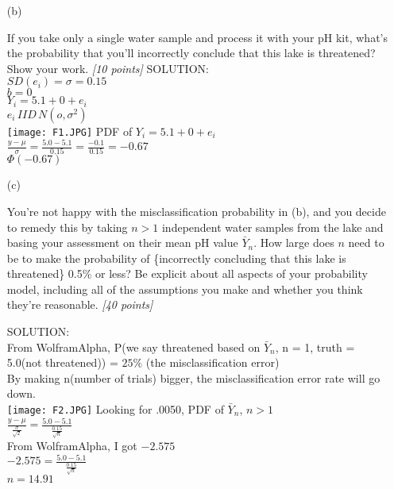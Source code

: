 \documentclass[12pt]{article}
\begin{document}
\begin{itemize}

\item[(b)]

If you take only a single water sample and process it with your pH kit,
what's the probability that you'll incorrectly conclude that this lake is
threatened? Show your work. \textit{[10 points]}
\medskip
SOLUTION: \\
$SD(e_i) = \sigma = 0.15$\\
$b = 0$\\
$Y_i = 5.1 + 0 + e_i$\\
$e_i \, IID \, N(o, \sigma^2)$\\
\texttt{[image: F1.JPG]} PDF of $Y_i = 5.1 + 0 + e_i$ \\
\huge $\frac{y - \mu}{\sigma} = \frac{5.0-5.1}{0.15} = \frac{-0.1}{0.15} = -0.67$ \\
$\Phi(-0.67)$

\item[(c)]

\normalsize You're not happy with the misclassification probability in (b), and you
decide to remedy this by taking $n > 1$ independent water samples from the
lake and basing your assessment on their mean pH value $\bar{ Y }_n$. How
large does $n$ need to be to make the probability of \{incorrectly
concluding that this lake is threatened\} 0.5\% or less? Be explicit
about all aspects of your probability model, including all of the assumptions you make and whether you think they're reasonable. \textit{[40 points]} 

SOLUTION:\\
From WolframAlpha, P(we say threatened based on $\bar Y_n$, n = 1, truth = 5.0(not threatened)) = $25\%$ (the misclassification error) \\
By making n(number of trials) bigger, the misclassification error rate will go down. \\
\texttt{[image: F2.JPG]} Looking for .0050, PDF of $\bar Y_n$, $n>1$ \\
\huge $\frac{y - \mu}{\frac{\sigma}{\sqrt{2}}} = \frac{5.0-5.1}{\frac{0.15}{\sqrt{n}}}$\\
\normalsize From WolframAlpha, I got $-2.575$ \\
\huge $-2.575 = \frac{5.0-5.1}{\frac{0.15}{\sqrt{n}}}$\\
$n = 14.91$


\end{itemize}
\end{document}
